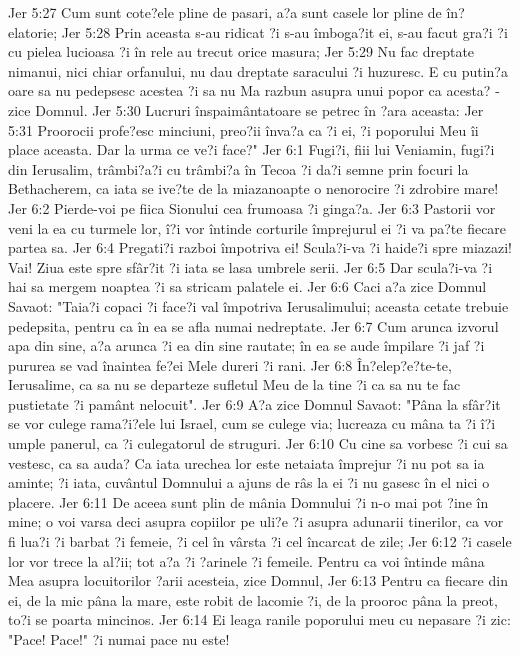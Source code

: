 Jer 5:27  Cum sunt cote?ele pline de pasari, a?a sunt casele lor pline de în?elatorie;
Jer 5:28  Prin aceasta s-au ridicat ?i s-au îmboga?it ei, s-au facut gra?i ?i cu pielea lucioasa ?i în rele au trecut orice masura;
Jer 5:29  Nu fac dreptate nimanui, nici chiar orfanului, nu dau dreptate saracului ?i huzuresc. E cu putin?a oare sa nu pedepsesc acestea ?i sa nu Ma razbun asupra unui popor ca acesta? - zice Domnul.
Jer 5:30  Lucruri înspaimântatoare se petrec în ?ara aceasta:
Jer 5:31  Proorocii profe?esc minciuni, preo?ii înva?a ca ?i ei, ?i poporului Meu îi place aceasta. Dar la urma ce ve?i face?"
Jer 6:1  Fugi?i, fiii lui Veniamin, fugi?i din Ierusalim, trâmbi?a?i cu trâmbi?a în Tecoa ?i da?i semne prin focuri la Bethacherem, ca iata se ive?te de la miazanoapte o nenorocire ?i zdrobire mare!
Jer 6:2  Pierde-voi pe fiica Sionului cea frumoasa ?i ginga?a.
Jer 6:3  Pastorii vor veni la ea cu turmele lor, î?i vor întinde corturile împrejurul ei ?i va pa?te fiecare partea sa.
Jer 6:4  Pregati?i razboi împotriva ei! Scula?i-va ?i haide?i spre miazazi! Vai! Ziua este spre sfâr?it ?i iata se lasa umbrele serii.
Jer 6:5  Dar scula?i-va ?i hai sa mergem noaptea ?i sa stricam palatele ei.
Jer 6:6  Caci a?a zice Domnul Savaot: "Taia?i copaci ?i face?i val împotriva Ierusalimului; aceasta cetate trebuie pedepsita, pentru ca în ea se afla numai nedreptate.
Jer 6:7  Cum arunca izvorul apa din sine, a?a arunca ?i ea din sine rautate; în ea se aude împilare ?i jaf ?i pururea se vad înaintea fe?ei Mele dureri ?i rani.
Jer 6:8  În?elep?e?te-te, Ierusalime, ca sa nu se departeze sufletul Meu de la tine ?i ca sa nu te fac pustietate ?i pamânt nelocuit".
Jer 6:9  A?a zice Domnul Savaot: "Pâna la sfâr?it  se vor culege rama?i?ele lui Israel, cum se culege via; lucreaza cu mâna ta ?i î?i umple panerul, ca ?i culegatorul de struguri.
Jer 6:10  Cu cine sa vorbesc ?i cui sa vestesc, ca sa auda? Ca iata urechea lor este netaiata împrejur ?i nu pot sa ia aminte; ?i iata, cuvântul Domnului a ajuns de râs la ei ?i nu gasesc în el nici o placere.
Jer 6:11  De aceea sunt plin de mânia Domnului ?i n-o mai pot ?ine în mine; o voi varsa deci asupra copiilor pe uli?e ?i asupra adunarii tinerilor, ca vor fi lua?i ?i barbat ?i femeie, ?i cel în vârsta ?i cel încarcat de zile;
Jer 6:12  ?i casele lor vor trece la al?ii; tot a?a ?i ?arinele ?i femeile. Pentru ca voi întinde mâna Mea asupra locuitorilor ?arii acesteia, zice Domnul,
Jer 6:13  Pentru ca fiecare din ei, de la mic pâna la mare, este robit de lacomie ?i, de la prooroc pâna la preot, to?i se poarta mincinos.
Jer 6:14  Ei leaga ranile poporului meu cu nepasare ?i zic: "Pace! Pace!" ?i numai pace nu este!
